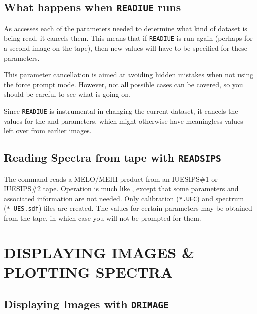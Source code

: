 \subsection{What happens when {\tt READIUE} runs}

As 
 accesses each of the parameters needed to determine what
kind of dataset is being read, it cancels them.  This means that if
\verb+READIUE+ is run again (perhaps for a second image on the tape), then new
values will have to be specified for these parameters.

This parameter cancellation is aimed at avoiding hidden mistakes when not
using the force prompt mode.  However, not all possible cases can be covered,
so you should be careful to see what is going on.

Since \verb+READIUE+ is instrumental in changing the current dataset, it cancels
the values for the 
 and 
 parameters, which might
otherwise have meaningless values left over from earlier images.


\subsection{\label{se:readsips}Reading Spectra from tape
            with {\tt READSIPS}}

The 
 command reads a MELO/MEHI product from an IUESIPS\#1 or
IUESIPS\#2 tape.  Operation is much like , 
except that some
parameters and associated information are not needed.  Only calibration
(\verb+*.UEC+) and spectrum (\verb+*_UES.sdf+) files are created.  The values
for certain parameters may be obtained from the tape, in which case you
will not be prompted for them.


\section{\label{se:disp}DISPLAYING IMAGES \& PLOTTING SPECTRA}


\subsection{\label{subse:drimage}Displaying Images with 
            {\tt DRIMAGE}}

